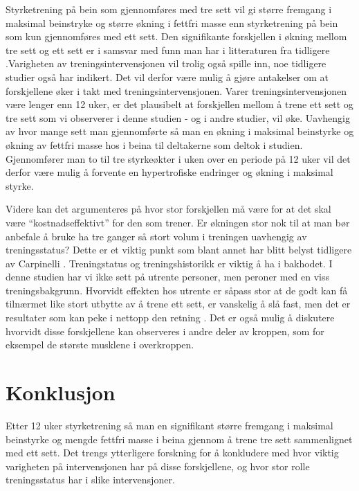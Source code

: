 \documentclass[
]{book}
\begin{document}
Styrketrening på bein som gjennomføres med tre sett vil gi større fremgang i maksimal beinstryke og større økning i fettfri masse enn styrketrening på bein som kun gjennomføres med ett sett. Den signifikante forskjellen i økning mellom tre sett og ett sett er i samsvar med funn man har i litteraturen fra tidligere \citep{rhea2002, munn2005, fröhlich2010}.Varigheten av treningsintervensjonen vil trolig også spille inn, noe tidligere studier også har indikert\citep{rhea2002}. Det vil derfor være mulig å gjøre antakelser om at forskjellene øker i takt med treningsintervensjonen. Varer treningsintervensjonen være lenger enn 12 uker, er det plausibelt at forskjellen mellom å trene ett sett og tre sett som vi observerer i denne studien - og i andre studier, vil øke. Uavhengig av hvor mange sett man gjennomførte så man en økning i maksimal beinstyrke og økning av fettfri masse hos i beina til deltakerne som deltok i studien. Gjennomfører man to til tre styrkeøkter i uken over en periode på 12 uker vil det derfor være mulig å forvente en hypertrofiske endringer og økning i maksimal styrke.

Videre kan det argumenteres på hvor stor forskjellen må være for at det skal være ``kostnadseffektivt'' for den som trener. Er økningen stor nok til at man bør anbefale å bruke ha tre ganger så stort volum i treningen uavhengig av treningsstatus? Dette er et viktig punkt som blant annet har blitt belyst tidligere av Carpinelli \citep{carpinelli1998}. Treningstatus og treningshistorikk er viktig å ha i bakhodet. I denne studien har vi ikke sett på utrente personer, men peroner med en viss treningsbakgrunn. Hvorvidt effekten hos utrente er såpass stor at de godt kan få tilnærmet like stort utbytte av å trene ett sett, er vanskelig å slå fast, men det er resultater som kan peke i nettopp den retning \citep{radaelli2014}. Det er også mulig å diskutere hvorvidt disse forskjellene kan observeres i andre deler av kroppen, som for eksempel de største musklene i overkroppen\citep{hass2000}.

\hypertarget{konklusjon}{%
\section{Konklusjon}\label{konklusjon}}

Etter 12 uker styrketrening så man en signifikant større fremgang i maksimal beinstyrke og mengde fettfri masse i beina gjennom å trene tre sett sammenlignet med ett sett. Det trengs ytterligere forskning for å konkludere med hvor viktig varigheten på intervensjonen har på disse forskjellene, og hvor stor rolle treningsstatus har i slike intervensjoner.
\end{document}
